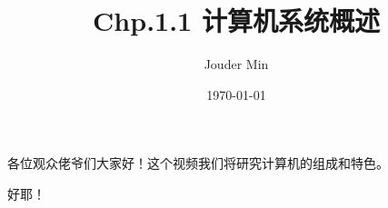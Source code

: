 \documentclass{script}
\title{\textbf{Chp.1.1 计算机系统概述}}
\author{Jouder Min}
\date{\today}
\begin{document}
\maketitle
\begin{description}[itemsep=1ex,leftmargin=0.92cm]
    \item[凌玲] 各位观众佬爷们大家好！这个视频我们将研究计算机的组成和特色。
    \item[凌伊] 好耶！
    \item[凌玲] 
\end{description}
\end{document}
